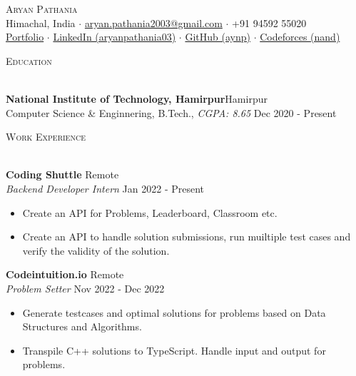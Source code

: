 \documentclass[a4paper]{article}
\newcommand{\lineunder} {
    \vspace*{-8pt} \\
    \hspace*{-18pt} \hrulefill \\
}
\newcommand{\header} [1] {
    {\hspace*{-18pt}\vspace*{6pt} \textsc{#1}}
    \vspace*{-6pt} \lineunder
}
\begin{document}

\begin{center}
	{\Huge \scshape {Aryan Pathania}}\\
	\vspace{0.5mm}
	Himachal, India $\cdot$ \href{mailto: aryan.pathania2003@gmail.com}{aryan.pathania2003@gmail.com} $\cdot$ +91 94592 55020\\
	\vspace{0.5mm}
	\href{https://aryanpathania.vercel.app/}{Portfolio} $\cdot$
	\href{https://linkedin.com/in/aryanpathania03/}{LinkedIn (aryanpathania03)} $\cdot$
	\href{https://www.github.com/aynp}{GitHub (aynp)} $\cdot$
	\href{https://www.github.com/aynp}{Codeforces (nand)} \\
\end{center}

\vspace{-4mm}

\header{Education}
\vspace{1mm}

\textbf{National Institute of Technology, Hamirpur}\hfill Hamirpur\\
Computer Science \& Enginnering, B.Tech., \textit{CGPA: 8.65} \hfill Dec 2020 - Present\\
\vspace{1.5mm}


\header{Work Experience}
\vspace{1mm}

\textbf{Coding Shuttle} \hfill Remote\\
\textit{Backend Developer Intern} \hfill Jan 2022 - Present\\
\begin{itemize}
  \item Create an API for Problems, Leaderboard, Classroom etc.
	\item Create an API to handle solution submissions, run muiltiple test cases and verify the validity of the solution.
\end{itemize}
\vspace{1.5mm}

\textbf{Codeintuition.io} \hfill Remote\\
\textit{Problem Setter} \hfill Nov 2022 - Dec 2022\\
\begin{itemize}
	\item Generate testcases and optimal solutions for problems based on Data Structures and Algorithms.
	\item Transpile C++ solutions to TypeScript. Handle input and output for problems.
\end{itemize}
\vspace{1.5mm}
\end{document}
